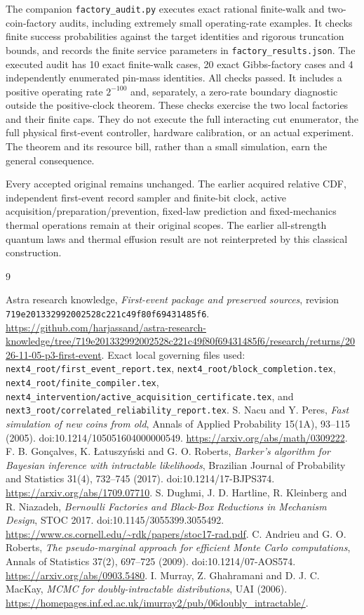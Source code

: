 The companion \texttt{factory\_audit.py} executes exact rational
finite-walk and two-coin-factory audits, including extremely small
operating-rate examples. It checks finite success probabilities against
the target identities and rigorous truncation bounds, and records the
finite service parameters in \texttt{factory\_results.json}.
The executed audit has 10 exact finite-walk cases, 20 exact Gibbs-factory
cases and 4 independently enumerated pin-mass identities. All checks
passed. It includes a positive operating rate $2^{-100}$ and, separately,
a zero-rate boundary diagnostic outside the positive-clock theorem.
These checks exercise the two local factories and their finite caps.
They do not execute the full interacting cut enumerator, the full physical
first-event controller, hardware calibration, or an actual experiment.
The theorem and its resource bill, rather than a small simulation, earn
the general consequence.

Every accepted original remains unchanged. The earlier acquired relative
CDF, independent first-event record sampler and finite-bit clock,
active acquisition/preparation/prevention, fixed-law prediction and
fixed-mechanics thermal operations remain at their original scopes.
The earlier all-strength quantum laws and thermal effusion result are not
reinterpreted by this classical construction.

\begin{thebibliography}{9}
\raggedright
Astra research knowledge, \emph{First-event package and preserved sources},
revision \texttt{719e201332992002528c221c49f80f69431485f6}.
\url{https://github.com/harjassand/astra-research-knowledge/tree/719e201332992002528c221c49f80f69431485f6/research/returns/2026-11-05-p3-first-event}.
Exact local governing files used:
\texttt{next4\_root/first\_event\_report.tex},
\texttt{next4\_root/block\_completion.tex},
\texttt{next4\_root/finite\_compiler.tex},
\texttt{next4\_intervention/active\_acquisition\_certificate.tex},
and \texttt{next3\_root/correlated\_reliability\_report.tex}.
S. Nacu and Y. Peres, \emph{Fast simulation of new coins from old},
Annals of Applied Probability 15(1A), 93--115 (2005).
doi:10.1214/105051604000000549.
\url{https://arxiv.org/abs/math/0309222}.
F. B. Gon\c{c}alves, K. \L atuszy\'nski and G. O. Roberts,
\emph{Barker's algorithm for Bayesian inference with intractable likelihoods},
Brazilian Journal of Probability and Statistics 31(4), 732--745 (2017).
doi:10.1214/17-BJPS374.
\url{https://arxiv.org/abs/1709.07710}.
S. Dughmi, J. D. Hartline, R. Kleinberg and R. Niazadeh,
\emph{Bernoulli Factories and Black-Box Reductions in Mechanism Design},
STOC 2017. doi:10.1145/3055399.3055492.
\url{https://www.cs.cornell.edu/~rdk/papers/stoc17-rad.pdf}.
C. Andrieu and G. O. Roberts,
\emph{The pseudo-marginal approach for efficient Monte Carlo computations},
Annals of Statistics 37(2), 697--725 (2009).
doi:10.1214/07-AOS574.
\url{https://arxiv.org/abs/0903.5480}.
I. Murray, Z. Ghahramani and D. J. C. MacKay,
\emph{MCMC for doubly-intractable distributions}, UAI (2006).
\url{https://homepages.inf.ed.ac.uk/imurray2/pub/06doubly_intractable/}.
\end{thebibliography}
